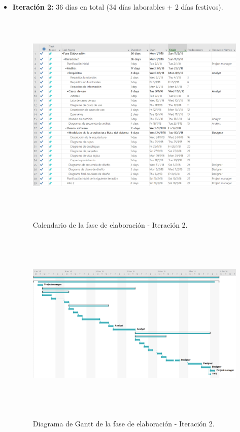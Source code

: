 \documentclass[12pt,a4paper, twoside]{report}
\begin{document}
\begin{itemize}
		\newpage
		\item \textbf{Iteración 2:} 36 días en total (34 días laborables + 2 días festivos).
		
		\begin{figure}[!ht]   
			\caption{Calendario de la fase de elaboración - Iteración 2.} 
			\begin{center} 
		 		\includegraphics[width=16cm,height=10cm]{Images/planning/iterations/It2_calendar} \\
				\label{fig:planning-it2-calendar} 
			\end{center}  
		\end{figure}  
		
		\begin{figure}[!ht]   
			\caption{Diagrama de Gantt de la fase de elaboración - Iteración 2.} 
			\begin{center} 
		 		\includegraphics[width=16cm,height=9cm]{Images/planning/iterations/It2_gantt} \\
				\label{fig:planning-it2-gantt} 
			\end{center}  
		\end{figure}  
		

\end{itemize}
\end{document}
